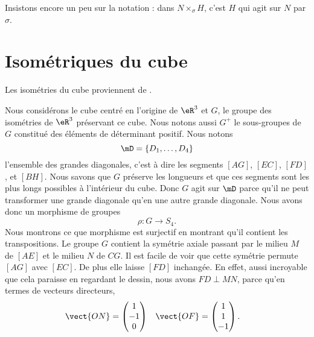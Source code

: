 Insistons encore un peu sur la notation : dans \( N\times_{\sigma}H\), c'est \( H\) qui agit sur \( N\) par \( \sigma\).

\section{Isométriques du cube}
\label{SecPVCmkxM}
Les isométries du cube proviennent de \cite{KXjFWKA}.

\begin{wrapfigure}{r}{5.0cm}
   \vspace{-0.5cm}        %
   \centering
   
\end{wrapfigure}
Nous considérons le cube centré en l'origine de \( \eR^3\) et \( G\), le groupe des isométries de \( \eR^3\) préservant ce cube. Nous notons aussi \( G^+\) le sous-groupes de \( G\) constitué des éléments de déterminant positif. Nous notons 
\begin{equation}
    \mD=\{ D_1,\ldots, D_4 \}
\end{equation}
l'ensemble des grandes diagonales, c'est à dire les segments \( [AG]\), \( [EC]\), \( [FD]\), et \( [BH]\). Nous savons que \( G\) préserve les longueurs et que ces segments sont les plus longs possibles à l'intérieur du cube. Donc \( G\) agit sur \( \mD\) parce qu'il ne peut transformer une grande diagonale qu'en une autre grande diagonale. Nous avons donc un morphisme de groupes
\begin{equation}
    \rho\colon G\to S_4.
\end{equation}
Nous montrons ce que morphisme est surjectif en montrant qu'il contient les transpositions. Le groupe \( G\) contient la symétrie axiale passant par le milieu \( M\) de \( [AE]\) et le milieu \( N\) de \( CG\). Il est facile de voir que cette symétrie permute \( [AG]\) avec \( [EC]\). De plus elle laisse \( [FD]\) inchangée. En effet, aussi incroyable que cela paraisse en regardant le dessin, nous avons \( FD\perp MN\), parce qu'en termes de vecteurs directeurs,
\begin{equation}
    \begin{aligned}[]
        \vect{ ON }&=\begin{pmatrix}
            1    \\ 
            -1    \\ 
            0    
        \end{pmatrix}&\vect{ OF }&=\begin{pmatrix}
            1    \\ 
            1    \\ 
            -1    
        \end{pmatrix}.
    \end{aligned}
\end{equation}

